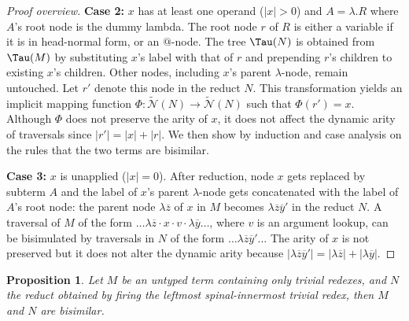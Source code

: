 \documentclass[xchauthor,chkrefs,GCNS,amsmath,amsthm,rotating,leaveRGB]{tcsg}
\theoremstyle{plain}
\newtheorem{proposition}[theorem]{Proposition}
\theoremstyle{definition}
\newcommand{\Nodes}{\mathcal{N}}
\newcommand{\ExtendedNodes}{\tilde{\Nodes}}
\newcommand{\ctree}{\Tau}
\begin{document}
\begin{proof}[Proof overview]
\textbf{Case 2:} $x$ has at least one operand ($|x|>0$) and $A = \lambda . R$
where $A$'s root node is the dummy lambda. The root node $r$ of $R$ is either
a variable if it is in head-normal form, or an $@$-node. The tree $\ctree
(N)$ is obtained from $\ctree (M)$ by substituting $x$'s label with that of
$r$ and prepending $r$'s children to existing $x$'s children. Other nodes,
including $x$'s parent $\lambda $-node, remain untouched. Let $r'$ denote
this node in the reduct $N$. This transformation yields an implicit mapping
function $\Phi : \ExtendedNodes (N)\rightarrow \ExtendedNodes (N)$ such that
$\Phi (r') = x$. Although $\Phi $ does not preserve the arity of $x$, it does
not affect the dynamic arity of traversals since $|r'| = |x| + |r|$. We then
show by induction and case analysis on the rules that the two terms are
bisimilar.

\textbf{Case 3:} $x$ is unapplied ($|x|=0$). After reduction, node $x$ gets
replaced by subterm $A$ and the label of $x$'s parent $\lambda $-node gets
concatenated with the label of $A$'s root node: the parent node $\lambda
\overline{z}$ of $x$ in $M$ becomes $\lambda \overline{z}\overline{y}'$ in
the reduct $N$. A traversal of $M$ of the form $\ldots \lambda \overline{z}
\cdot x \cdot v \cdot \lambda \overline{y} \ldots $, where $v$ is an argument
lookup, can be bisimulated by traversals in $N$ of the form $\ldots \lambda
\overline{z}\overline{y}' \ldots $ The arity of $x$ is not preserved but it
does not alter the dynamic arity because $|\lambda{\overline{z}
\overline{y}'}| = |\lambda{\overline{z}}| +  |\lambda{\overline{y}}|$.
\end{proof}


\begin{proposition}\label{prop:ulctrav_sound_for_trivialreduction}
Let $M$ be an untyped term containing only trivial redexes, and $N$ the
reduct obtained by firing the \emph{leftmost spinal-innermost} trivial redex,
then $M$ and $N$ are bisimilar.
\end{proposition}
\end{document}
